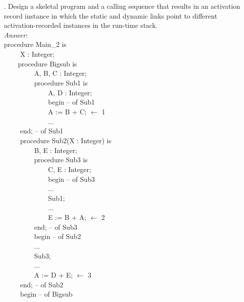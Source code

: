 \documentclass[a4paper,12pt]{article}
\begin{document}
. Design a skeletal program and a calling sequence that results in an activation
   record instance in which the static and dynamic links point to different
   activation-recorded instances in the run-time stack. \\
\emph{Answer}:\\
procedure Main\_2 is\\
\verb+    + X : Integer;\\
\verb+    +procedure Bigsub is\\
\verb+    +\verb+    +    A, B, C : Integer;\\
\verb+    +\verb+    +    procedure Sub1 is\\
\verb+    +\verb+    +\verb+    +    A, D : Integer;\\
\verb+    +\verb+    +\verb+    +    begin -- of Sub1\\
\verb+    +\verb+    +\verb+    +    A := B + C; $\longleftarrow$ 1\\
\verb+    +\verb+    +\verb+    +      ...\\
\verb+    +    end; -- of Sub1\\
\verb+    +    procedure Sub2(X : Integer) is\\
\verb+    +\verb+    +      B, E : Integer;\\
\verb+    +\verb+    +      procedure Sub3 is\\
\verb+    +\verb+    +\verb+    +        C, E : Integer;\\
\verb+    +\verb+    +\verb+    +        begin -- of Sub3\\
\verb+    +\verb+    +\verb+    +        ...\\
\verb+    +\verb+    +\verb+    +        Sub1;\\
\verb+    +\verb+    +\verb+    +        ...\\
\verb+    +\verb+    +\verb+    +        E := B + A; $\longleftarrow$ 2\\
\verb+    +\verb+    +      end; -- of Sub3\\
\verb+    +\verb+    +      begin -- of Sub2\\
\verb+    +\verb+    +      ...\\
\verb+    +\verb+    +      Sub3;\\
\verb+    +\verb+    +      ...\\
\verb+    +\verb+    +      A := D + E; $\longleftarrow$ 3\\
\verb+    +    end; -- of Sub2\\
\verb+    +    begin -- of Bigsub\\
\end{document}
